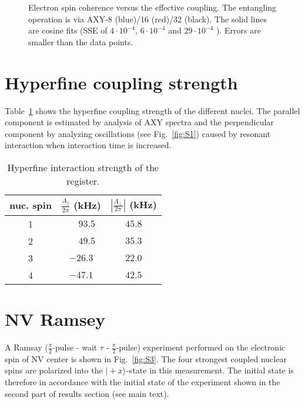 \documentclass[aps,prl,floatfix,twocolumn,footinbib,superscriptaddress]{revtex4-1}
\begin{document}
\begin{figure}[h]
\centerline{}
\caption{Electron spin coherence versus the effective coupling. The entangling operation is via AXY-8 (blue)/16 (red)/32 (black). The solid lines are cosine fits (SSE of $4\cdot10^{-4}$, $6\cdot10^{-4}$ and $29\cdot10^{-4}$ ). Errors are smaller than the data points.}
\label{fig:S2}
\end{figure}

\section{Hyperfine coupling strength}

Table~\ref{tab:HF} shows the hyperfine coupling strength of the different nuclei. The parallel component is estimated by analysis of AXY spectra and the perpendicular component by analyzing oscillations (see Fig.~\ref{fig:S1}) caused by resonant interaction when interaction time is increased. 

\begin{table}
\caption{Hyperfine interaction strength of the register.}
\begin{center}
\begin{tabular}{ c c c }
  \hline
  \textbf{nuc. spin} & \textbf{$\frac{A_\parallel}{2\pi}$ (kHz)} & \textbf{$\left| \frac{A_\perp}{2\pi}\right|$ (kHz)} \\ 
  \hline
  1 & $\phantom{-}93.5$ & $45.8$ \\
  2 & $\phantom{-}49.5$ & $35.3$ \\
  3 & $-26.3$ &$22.0$\\
  4 & $-47.1$ & $42.5$\\
  \hline
\end{tabular}
\end{center}
\label{tab:HF}
\end{table}

\section{NV Ramsey}

A Ramsay ($\frac{\pi}{2}$-pulse - wait $\tau$ - $\frac{\pi}{2}$-pulse) experiment performed on the electronic spin of NV center is shown in Fig.~\ref{fig:S3}. The four strongest coupled nuclear spins are polarized into the $|+x\rangle$-state in this measurement. The initial state is therefore in accordance with the initial state of the experiment shown in the second part of results section (see main text). 
\end{document}
